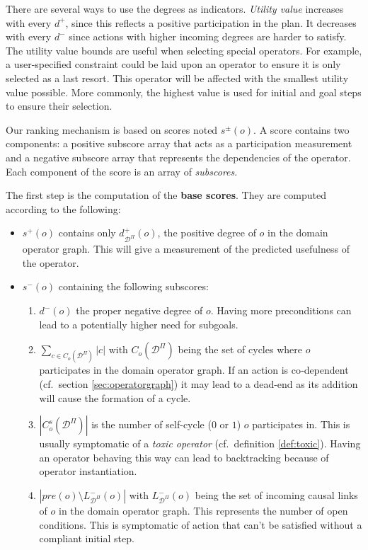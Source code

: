 \documentclass[11pt,a4paper,twoside,openright,titlepage,numbers=noenddot,headinclude,cleardoublepage=empty,openany]{scrreprt}
\theoremstyle{plain}
\theoremstyle{definition}
\theoremstyle{remark}
\providecommand{\tightlist}{%
  \setlength{\itemsep}{0pt}\setlength{\parskip}{0pt}}
\begin{document}
There are several ways to use the degrees as indicators. \emph{Utility
value} increases with every \(d^+\), since this reflects a positive
participation in the plan. It decreases with every \(d^-\) since actions
with higher incoming degrees are harder to satisfy. The utility value
bounds are useful when selecting special operators. For example, a
user-specified constraint could be laid upon an operator to ensure it is
only selected as a last resort. This operator will be affected with the
smallest utility value possible. More commonly, the highest value is
used for initial and goal steps to ensure their selection.

Our ranking mechanism is based on scores noted \(s^\pm(o)\). A score
contains two components: a positive subscore array that acts as a
participation measurement and a negative subscore array that represents
the dependencies of the operator. Each component of the score is an
array of \emph{subscores}.

The first step is the computation of the \textbf{base scores}. They are
computed according to the following:

\begin{itemize}
\tightlist
\item
  \(s^+(o)\) contains only \(d_{\mathcal{D}^\Pi}^+(o)\), the positive
  degree of \(o\) in the domain operator graph. This will give a
  measurement of the predicted usefulness of the operator.
\item
  \(s^-(o)\) containing the following subscores:

  \begin{enumerate}
  \def\labelenumi{\arabic{enumi}.}
  \tightlist
  \item
    \(d^-(o)\) the proper negative degree of \(o\). Having more
    preconditions can lead to a potentially higher need for subgoals.
  \item
    \(\sum_{c \in C_o(\mathcal{D}^\Pi)}|c|\) with
    \(C_o(\mathcal{D}^\Pi)\) being the set of cycles where \(o\)
    participates in the domain operator graph. If an action is
    co‑dependent (cf.~section \ref{sec:operatorgraph}) it may lead to a
    dead-end as its addition will cause the formation of a cycle.
  \item
    \(|C_o^s(\mathcal{D}^\Pi)|\) is the number of self-cycle (\(0\) or
    \(1\)) \(o\) participates in. This is usually symptomatic of a
    \emph{toxic operator} (cf.~definition \ref{def:toxic}). Having an
    operator behaving this way can lead to backtracking because of
    operator instantiation.
  \item
    \(\left|pre(o) \setminus L_{\mathcal{D}^\Pi}^-(o)\right|\) with
    \(L_{\mathcal{D}^\Pi}^-(o)\) being the set of incoming causal links
    of \(o\) in the domain operator graph. This represents the number of
    open conditions. This is symptomatic of action that can't be
    satisfied without a compliant initial step.
  \end{enumerate}
\end{itemize}
\end{document}
